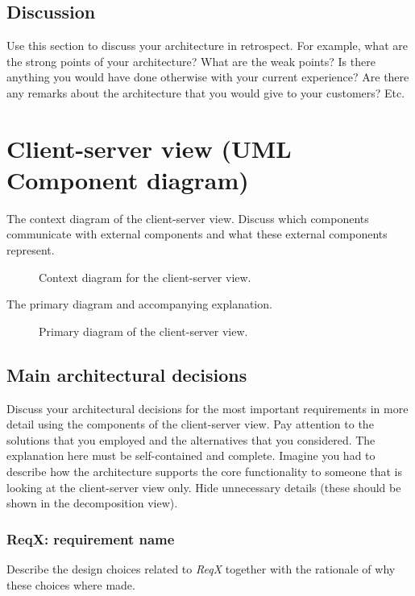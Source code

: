 \documentclass[a4paper,10pt]{article}
\begin{document}
\subsection{Discussion}
Use this section to discuss your architecture in retrospect.
For example, what are the strong points of your architecture?
What are the weak points? Is there anything you would have done otherwise with
your current experience?
Are there any remarks about the architecture that you would give to your
customers?
Etc.

\section{Client-server view (UML Component diagram)}\label{sec:client-server}
The context diagram of the client-server view.
Discuss which components communicate with external components and what these
external components represent.

\begin{figure}[!htp]
    \centering
    \caption{Context diagram for the client-server view.
        }\label{fig:cc-context}
\end{figure}

The primary diagram and accompanying explanation.

\begin{figure}[!htp]
    \centering
    \caption{Primary diagram of the client-server view.}\label{fig:cs-primary}
\end{figure}

\subsection{Main architectural decisions}
Discuss your architectural decisions for the most important requirements in
more detail using the components of the client-server view.
Pay attention to the solutions that you employed and the alternatives that you
considered.
The explanation here must be self-contained and complete.
Imagine you had to describe how the architecture supports the core
functionality to someone that is looking at the client-server view only.
Hide unnecessary details (these should be shown in the decomposition view).

\subsubsection{ReqX\@: requirement name}
Describe the design choices related to \emph{ReqX} together with the rationale
of why these choices where made.
\end{document}
